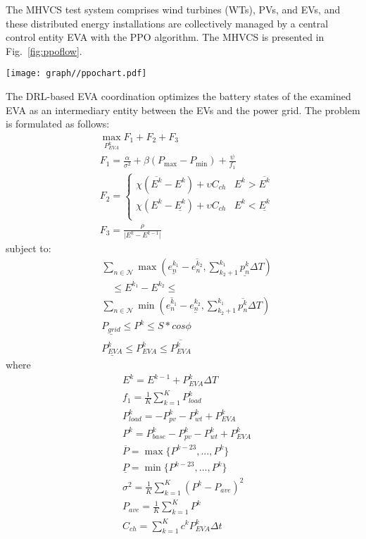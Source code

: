 \documentclass[journal,twoside]{IEEEtran}
\begin{document}
The MHVCS test system comprises wind turbines (WTs), PVs, and EVs, and these distributed energy installations are collectively managed by a central control entity EVA with the PPO algorithm. The MHVCS is presented in Fig.~\ref{fig:ppoflow}.
\begin{figure*}[htbp]
\centering
\texttt{[image: graph//ppochart.pdf]}
\caption{Workflow of proposed hierarchical V2G coordination strategy.}
\label{fig:ppoflow}
\end{figure*}
The DRL-based EVA coordination optimizes the battery states of the examined EVA as an intermediary entity between the EVs and the power grid. The problem is formulated as follows:
\begin{align}
&\max\limits_{P_{EVA}^{k}} F_1+ F_2+ F_3\label{pwgoal}\\
&F_1=\frac{\alpha}{\sigma^{2}}+\beta\left(P_{\max }-P_{\min }\right)+\frac\psi{f_1}\\
&F_2=\left\{\begin{array}{cc}
\chi(\overline{E^k}-E^k)+\upsilon C_{ch} &E^{k}>\overline{E^k} \\
\chi(E^k-\underline{E^k})+\upsilon C_{ch} &E^{k}<\underline{E^k} \\
\end{array}\right.\label{F2}\\
&F_3=\frac \rho {\lvert E^k-E^{k-1} \rvert}
\end{align}
subject to:
\begin{align}
& \sum_{n \in \mathcal{N}} \max \left(\underline{e_n^{k_1}}-\overline{e_n^{k_2}}, \sum_{k_2+1}^{k_1} \underline{p_n^k} \Delta T\right) \nonumber\\
& \quad \leq E^{k_1}-E^{k_2} \leq \nonumber\\
&\sum_{n \in \mathcal{N}} \min \left(\overline{e_n^{k_1}}-\underline{e_n^{k_2}}, \sum_{k_2+1}^{k_1} \overline{p_n^{k}} \Delta T\right)\label{E}\\ 
&\underline{P_{grid}} \leq P^k \leq S*cos\phi\label{ptie}\\
&\underline{P_{EVA}^k} \leq P_{EVA}^k \leq \overline{P_{EVA}^k}\label{peva}
\end{align}
where
\begin{align}
&E^k=E^{k-1}+P_{EVA}^{k}\Delta T\\
&f_1 = \frac1K \sum_{k=1}^{K}P_{load}^k\label{f1}\\
&P_{load}^k = -P_{pv}^k-P_{wt}^k+P_{EVA}^{k}\label{pload}\\
&P^k=P_{base}^k-P_{pv}^k-P_{wt}^k+P_{EVA}^{k}\label{powerload}\\
&\overline{P}=\max{\{P^{k-23},...,P^k\}}\label{maxpower}\\
&\underline{P}=\min{\{P^{k-23},...,P^k\}}\label{minpower}\\
&\sigma^{2}=\frac{1}{K} \sum_{k=1}^{K}\left(P^k-{P}_{ave}\right)^{2}\label{variance}\\
&{P}_{ave}=\frac{1}{K} \sum_{k=1}^{K}P^k\label{ap}\\
&C_{ch}= \sum_{k=1}^Kc^{k}P_{EVA}^{k}\Delta t\label{cost}
\end{align}
\end{document}
